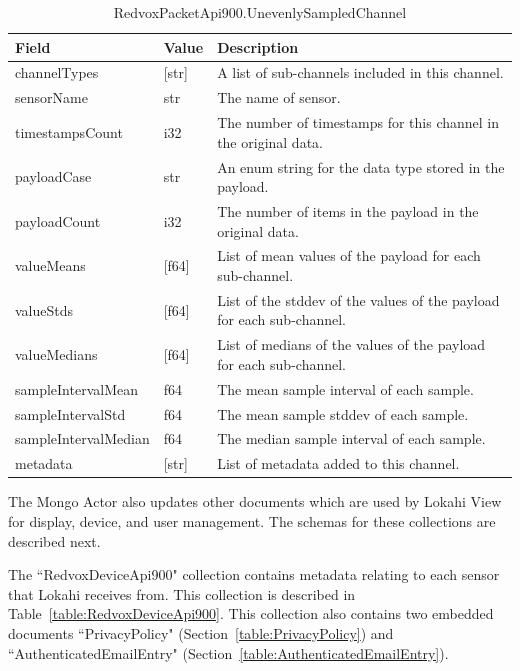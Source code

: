 \begin{table}[H]
	\centering
	\caption{RedvoxPacketApi900.UnevenlySampledChannel}
	\begin{tabularx}{\textwidth}{llX}
		\toprule
		\textbf{Field} & \textbf{Value} & \textbf{Description} \\
		\midrule
		channelTypes & [str] & A list of sub-channels included in this channel. \\
		sensorName & str & The name of sensor. \\
		timestampsCount & i32 & The number of timestamps for this channel in the original data. \\
		payloadCase & str & An enum string for the data type stored in the payload. \\
		payloadCount & i32 & The number of items in the payload in the original data. \\
		valueMeans & [f64] & List of mean values of the payload for each sub-channel. \\
		valueStds & [f64] & List of the stddev of the values of the payload for each sub-channel. \\
		valueMedians & [f64] & List of medians of the values of the payload for each sub-channel. \\
		sampleIntervalMean & f64 & The mean sample interval of each sample. \\
		sampleIntervalStd & f64 & The mean sample stddev of each sample. \\
		sampleIntervalMedian & f64 & The median sample interval of each sample. \\
		metadata & [str] & List of metadata added to this channel. \\
		\bottomrule
	\end{tabularx}
	\label{table:UnevenlySampledChannel}
\end{table}

The Mongo Actor also updates other documents which are used by Lokahi View for display, device, and user management. The schemas for these collections are described next.

The ``RedvoxDeviceApi900" collection contains metadata relating to each sensor that Lokahi receives from. This collection is described in Table~\ref{table:RedvoxDeviceApi900}. This collection also contains two embedded documents ``PrivacyPolicy" (Section~\ref{table:PrivacyPolicy}) and ``AuthenticatedEmailEntry" (Section~\ref{table:AuthenticatedEmailEntry}).

